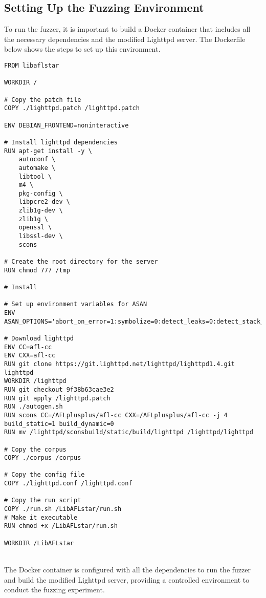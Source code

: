 \subsection{Setting Up the Fuzzing Environment}

To run the fuzzer, it is important to build a Docker container that includes all the necessary dependencies and the modified Lighttpd server. The Dockerfile below shows the steps to set up this environment.

\begin{lstlisting}
FROM libaflstar 

WORKDIR /

# Copy the patch file
COPY ./lighttpd.patch /lighttpd.patch

ENV DEBIAN_FRONTEND=noninteractive

# Install lighttpd dependencies
RUN apt-get install -y \
    autoconf \
    automake \
    libtool \
    m4 \
    pkg-config \
    libpcre2-dev \
    zlib1g-dev \
    zlib1g \
    openssl \
    libssl-dev \
    scons

# Create the root directory for the server
RUN chmod 777 /tmp

# Install

# Set up environment variables for ASAN
ENV ASAN_OPTIONS='abort_on_error=1:symbolize=0:detect_leaks=0:detect_stack_use_after_return=1:detect_container_overflow=0:poison_array_cookie=0:malloc_fill_byte=0:max_malloc_fill_size=16777216'

# Download lighttpd
ENV CC=afl-cc
ENV CXX=afl-cc
RUN git clone https://git.lighttpd.net/lighttpd/lighttpd1.4.git lighttpd
WORKDIR /lighttpd 
RUN git checkout 9f38b63cae3e2
RUN git apply /lighttpd.patch
RUN ./autogen.sh  
RUN scons CC=/AFLplusplus/afl-cc CXX=/AFLplusplus/afl-cc -j 4 build_static=1 build_dynamic=0
RUN mv /lighttpd/sconsbuild/static/build/lighttpd /lighttpd/lighttpd

# Copy the corpus
COPY ./corpus /corpus

# Copy the config file
COPY ./lighttpd.conf /lighttpd.conf

# Copy the run script
COPY ./run.sh /LibAFLstar/run.sh
# Make it executable
RUN chmod +x /LibAFLstar/run.sh

WORKDIR /LibAFLstar
\end{lstlisting}
\phantom{}\\
The Docker container is configured with all the dependencies to run the fuzzer and build the modified Lighttpd server, providing a controlled environment to conduct the fuzzing experiment.
